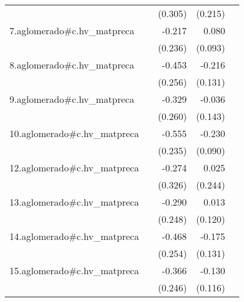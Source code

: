 {\begin{longtable}{l*{4}{D{.}{.}{-1}}}
            &                     &     (0.305)         &     (0.215)         &                     \\
\addlinespace
7.aglomerado#c.hv\_matpreca&                     &      -0.217         &       0.080         &                     \\
            &                     &     (0.236)         &     (0.093)         &                     \\
\addlinespace
8.aglomerado#c.hv\_matpreca&                     &      -0.453         &      -0.216         &                     \\
            &                     &     (0.256)         &     (0.131)         &                     \\
\addlinespace
9.aglomerado#c.hv\_matpreca&                     &      -0.329         &      -0.036         &                     \\
            &                     &     (0.260)         &     (0.143)         &                     \\
\addlinespace
10.aglomerado#c.hv\_matpreca&                     &      -0.555\sym{*}  &      -0.230\sym{*}  &                     \\
            &                     &     (0.235)         &     (0.090)         &                     \\
\addlinespace
12.aglomerado#c.hv\_matpreca&                     &      -0.274         &       0.025         &                     \\
            &                     &     (0.326)         &     (0.244)         &                     \\
\addlinespace
13.aglomerado#c.hv\_matpreca&                     &      -0.290         &       0.013         &                     \\
            &                     &     (0.248)         &     (0.120)         &                     \\
\addlinespace
14.aglomerado#c.hv\_matpreca&                     &      -0.468         &      -0.175         &                     \\
            &                     &     (0.254)         &     (0.131)         &                     \\
\addlinespace
15.aglomerado#c.hv\_matpreca&                     &      -0.366         &      -0.130         &                     \\
            &                     &     (0.246)         &     (0.116)         &                     \\

\end{longtable}}
